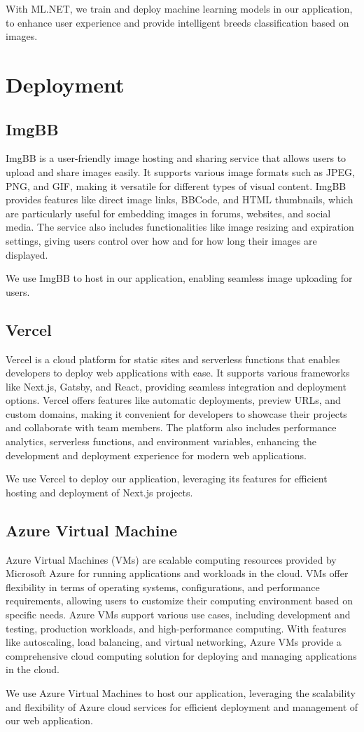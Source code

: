 With ML.NET, we train and deploy machine learning models in our application,
to enhance user experience and provide intelligent breeds classification
based on images.

\section{Deployment}

\subsection{ImgBB}
ImgBB is a user-friendly image hosting and sharing service that allows users 
to upload and share images easily. It supports various image formats such as 
JPEG, PNG, and GIF, making it versatile for different types of visual content. 
ImgBB provides features like direct image links, BBCode, and HTML thumbnails, 
which are particularly useful for embedding images in forums, websites, and 
social media. The service also includes functionalities like image resizing and 
expiration settings, giving users control over how and for how long their images 
are displayed.

We use ImgBB to host in our application, enabling seamless
image uploading for users.

\subsection{Vercel}
Vercel is a cloud platform for static sites and serverless functions that enables
developers to deploy web applications with ease. It supports various frameworks
like Next.js, Gatsby, and React, providing seamless integration and deployment
options. Vercel offers features like automatic deployments, preview URLs, and
custom domains, making it convenient for developers to showcase their projects
and collaborate with team members. The platform also includes performance
analytics, serverless functions, and environment variables, enhancing the
development and deployment experience for modern web applications.

We use Vercel to deploy our application, leveraging its features for
efficient hosting and deployment of Next.js projects.

\subsection{Azure Virtual Machine}
Azure Virtual Machines (VMs) are scalable computing resources provided by
Microsoft Azure for running applications and workloads in the cloud. VMs offer
flexibility in terms of operating systems, configurations, and performance
requirements, allowing users to customize their computing environment based on
specific needs. Azure VMs support various use cases, including development and
testing, production workloads, and high-performance computing. With features like
autoscaling, load balancing, and virtual networking, Azure VMs provide a
comprehensive cloud computing solution for deploying and managing applications
in the cloud.

We use Azure Virtual Machines to host our application, leveraging the
scalability and flexibility of Azure cloud services for efficient
deployment and management of our web application.